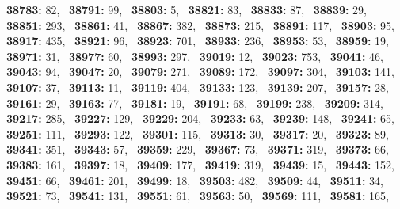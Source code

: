 \textbf{38783:} 82,\allowbreak~ 
\textbf{38791:} 99,\allowbreak~ 
\textbf{38803:} 5,\allowbreak~ 
\textbf{38821:} 83,\allowbreak~ 
\textbf{38833:} 87,\allowbreak~ 
\textbf{38839:} 29,\allowbreak~ 
\textbf{38851:} 293,\allowbreak~ 
\textbf{38861:} 41,\allowbreak~ 
\textbf{38867:} 382,\allowbreak~ 
\textbf{38873:} 215,\allowbreak~ 
\textbf{38891:} 117,\allowbreak~ 
\textbf{38903:} 95,\allowbreak~ 
\textbf{38917:} 435,\allowbreak~ 
\textbf{38921:} 96,\allowbreak~ 
\textbf{38923:} 701,\allowbreak~ 
\textbf{38933:} 236,\allowbreak~ 
\textbf{38953:} 53,\allowbreak~ 
\textbf{38959:} 19,\allowbreak~ 
\textbf{38971:} 31,\allowbreak~ 
\textbf{38977:} 60,\allowbreak~ 
\textbf{38993:} 297,\allowbreak~ 
\textbf{39019:} 12,\allowbreak~ 
\textbf{39023:} 753,\allowbreak~ 
\textbf{39041:} 46,\allowbreak~ 
\textbf{39043:} 94,\allowbreak~ 
\textbf{39047:} 20,\allowbreak~ 
\textbf{39079:} 271,\allowbreak~ 
\textbf{39089:} 172,\allowbreak~ 
\textbf{39097:} 304,\allowbreak~ 
\textbf{39103:} 141,\allowbreak~ 
\textbf{39107:} 37,\allowbreak~ 
\textbf{39113:} 11,\allowbreak~ 
\textbf{39119:} 404,\allowbreak~ 
\textbf{39133:} 123,\allowbreak~ 
\textbf{39139:} 207,\allowbreak~ 
\textbf{39157:} 28,\allowbreak~ 
\textbf{39161:} 29,\allowbreak~ 
\textbf{39163:} 77,\allowbreak~ 
\textbf{39181:} 19,\allowbreak~ 
\textbf{39191:} 68,\allowbreak~ 
\textbf{39199:} 238,\allowbreak~ 
\textbf{39209:} 314,\allowbreak~ 
\textbf{39217:} 285,\allowbreak~ 
\textbf{39227:} 129,\allowbreak~ 
\textbf{39229:} 204,\allowbreak~ 
\textbf{39233:} 63,\allowbreak~ 
\textbf{39239:} 148,\allowbreak~ 
\textbf{39241:} 65,\allowbreak~ 
\textbf{39251:} 111,\allowbreak~ 
\textbf{39293:} 122,\allowbreak~ 
\textbf{39301:} 115,\allowbreak~ 
\textbf{39313:} 30,\allowbreak~ 
\textbf{39317:} 20,\allowbreak~ 
\textbf{39323:} 89,\allowbreak~ 
\textbf{39341:} 351,\allowbreak~ 
\textbf{39343:} 57,\allowbreak~ 
\textbf{39359:} 229,\allowbreak~ 
\textbf{39367:} 73,\allowbreak~ 
\textbf{39371:} 319,\allowbreak~ 
\textbf{39373:} 66,\allowbreak~ 
\textbf{39383:} 161,\allowbreak~ 
\textbf{39397:} 18,\allowbreak~ 
\textbf{39409:} 177,\allowbreak~ 
\textbf{39419:} 319,\allowbreak~ 
\textbf{39439:} 15,\allowbreak~ 
\textbf{39443:} 152,\allowbreak~ 
\textbf{39451:} 66,\allowbreak~ 
\textbf{39461:} 201,\allowbreak~ 
\textbf{39499:} 18,\allowbreak~ 
\textbf{39503:} 482,\allowbreak~ 
\textbf{39509:} 44,\allowbreak~ 
\textbf{39511:} 34,\allowbreak~ 
\textbf{39521:} 73,\allowbreak~ 
\textbf{39541:} 131,\allowbreak~ 
\textbf{39551:} 61,\allowbreak~ 
\textbf{39563:} 50,\allowbreak~ 
\textbf{39569:} 111,\allowbreak~ 
\textbf{39581:} 165,\allowbreak~ 
